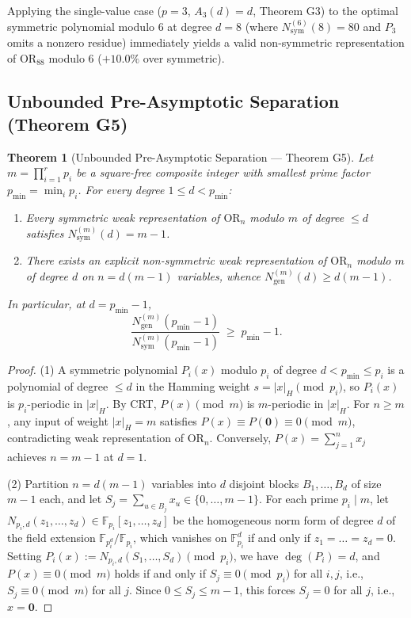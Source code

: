 \documentclass[11pt,a4paper]{article}
\newtheorem{theorem}{Theorem}[section]
\theoremstyle{definition}
\newcommand{\F}{\mathbb{F}}
\newcommand{\OR}{\mathrm{OR}}
\newcommand{\Nsym}{N_{\mathrm{sym}}}
\newcommand{\Ngen}{N_{\mathrm{gen}}}
\begin{document}
Applying the single-value case ($p=3$, $A_3(d) = d$, Theorem G3) to the optimal symmetric polynomial modulo $6$ at degree $d = 8$ (where $\Nsym^{(6)}(8) = 80$ and $P_3$ omits a nonzero residue) immediately yields a valid non-symmetric representation of $\OR_{88}$ modulo $6$ ($+10.0\%$ over symmetric).

\subsection{Unbounded Pre-Asymptotic Separation (Theorem G5)}

\begin{theorem}[Unbounded Pre-Asymptotic Separation --- Theorem G5]
\label{thm:g5}
Let $m = \prod_{i=1}^r p_i$ be a square-free composite integer with smallest prime factor $p_{\min} = \min_i p_i$. For every degree $1 \le d < p_{\min}$:
\begin{enumerate}[leftmargin=*,nosep]
  \item Every symmetric weak representation of $\OR_n$ modulo $m$ of degree $\le d$ satisfies $\Nsym^{(m)}(d) = m - 1$.
  \item There exists an explicit non-symmetric weak representation of $\OR_n$ modulo $m$ of degree $d$ on $n = d(m-1)$ variables, whence $\Ngen^{(m)}(d) \ge d(m-1)$.
\end{enumerate}
In particular, at $d = p_{\min} - 1$,
\[
  \frac{\Ngen^{(m)}(p_{\min} - 1)}{\Nsym^{(m)}(p_{\min} - 1)} \;\ge\; p_{\min} - 1.
\]
\end{theorem}

\begin{proof}
(1) A symmetric polynomial $P_i(x)$ modulo $p_i$ of degree $d < p_{\min} \le p_i$ is a polynomial of degree $\le d$ in the Hamming weight $s = |x|_H \pmod{p_i}$, so $P_i(x)$ is $p_i$-periodic in $|x|_H$. By CRT, $P(x) \pmod m$ is $m$-periodic in $|x|_H$. For $n \ge m$, any input of weight $|x|_H = m$ satisfies $P(x) \equiv P(\mathbf{0}) \equiv 0 \pmod m$, contradicting weak representation of $\OR_n$. Conversely, $P(x) = \sum_{j=1}^n x_j$ achieves $n = m - 1$ at $d = 1$.

(2) Partition $n = d(m-1)$ variables into $d$ disjoint blocks $B_1,\dots,B_d$ of size $m - 1$ each, and let $S_j = \sum_{u \in B_j} x_u \in \{0,\dots,m-1\}$. For each prime $p_i \mid m$, let $N_{p_i,d}(z_1,\dots,z_d) \in \F_{p_i}[z_1,\dots,z_d]$ be the homogeneous norm form of degree $d$ of the field extension $\F_{p_i^d}/\F_{p_i}$, which vanishes on $\F_{p_i}^d$ if and only if $z_1 = \dots = z_d = 0$. Setting $P_i(x) := N_{p_i,d}(S_1,\dots,S_d) \pmod{p_i}$, we have $\deg(P_i) = d$, and $P(x) \equiv 0 \pmod m$ holds if and only if $S_j \equiv 0 \pmod{p_i}$ for all $i,j$, i.e., $S_j \equiv 0 \pmod m$ for all $j$. Since $0 \le S_j \le m - 1$, this forces $S_j = 0$ for all $j$, i.e., $x = \mathbf{0}$.
\end{proof}
\end{document}
